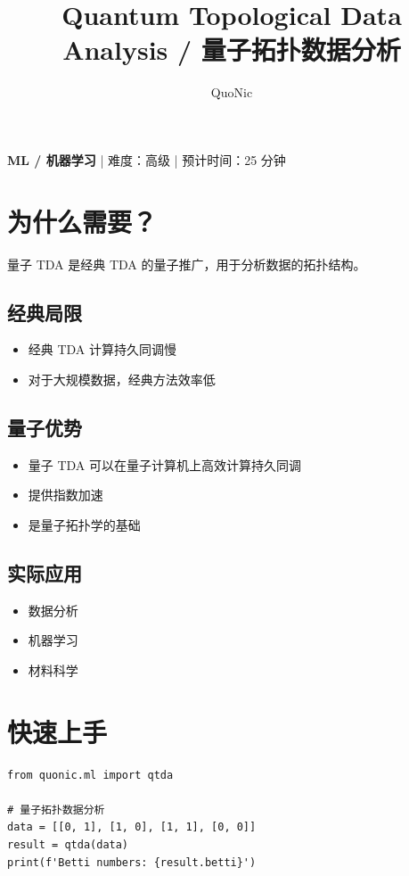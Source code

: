 \documentclass[12pt,a4paper]{article}
\title{Quantum Topological Data Analysis / 量子拓扑数据分析}
\author{QuoNic}
\date{}
\begin{document}
\maketitle

\begin{center}
\textbf{ML / 机器学习} | 难度：高级 | 预计时间：25 分钟
\end{center}

\tableofcontents
\newpage

\section{为什么需要？}

量子 TDA 是经典 TDA 的量子推广，用于分析数据的拓扑结构。

\subsection{经典局限}
\begin{itemize}
  \item 经典 TDA 计算持久同调慢
  \item 对于大规模数据，经典方法效率低
\end{itemize}

\subsection{量子优势}
\begin{itemize}
  \item 量子 TDA 可以在量子计算机上高效计算持久同调
  \item 提供指数加速
  \item 是量子拓扑学的基础
\end{itemize}

\subsection{实际应用}
\begin{itemize}
  \item 数据分析
  \item 机器学习
  \item 材料科学
\end{itemize}

\section{快速上手}

\begin{verbatim}
from quonic.ml import qtda

# 量子拓扑数据分析
data = [[0, 1], [1, 0], [1, 1], [0, 0]]
result = qtda(data)
print(f'Betti numbers: {result.betti}')
\end{verbatim}
\end{document}

